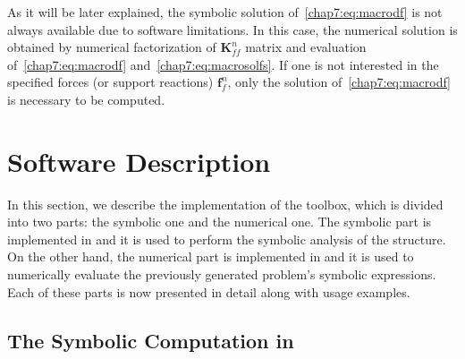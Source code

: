%
As it will be later explained, the symbolic solution of~\eqref{chap7:eq:macrodf} is not always available due to software limitations. In this case, the numerical solution is obtained by numerical factorization of $\mathbf{K}^{n}_{ff}$ matrix and evaluation of~\eqref{chap7:eq:macrodf} and~\eqref{chap7:eq:macrosolfs}. If one is not interested in the specified forces (or support reactions) $\mathbf{f}^{n}_{f}$, only the solution of~\eqref{chap7:eq:macrodf} is necessary to be computed.


\section{Software Description}
\label{chap7:sec:software_description}

In this section, we describe the implementation of the \TrussMe{} toolbox, which is divided into two parts: the symbolic one and the numerical one. The symbolic part is implemented in \Maple{} and it is used to perform the symbolic analysis of the structure. On the other hand, the numerical part is implemented in \Matlab{} and it is used to numerically evaluate the previously generated problem's symbolic expressions. Each of these parts is now presented in detail along with usage examples.

\subsection{The Symbolic Computation in \Maple{}}
\label{chap7:subsec:symbolic_computation}

